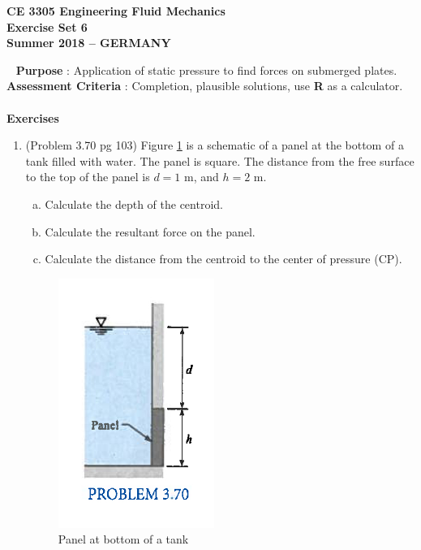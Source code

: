 \documentclass[12pt]{article}
\begin{document}
\begingroup
\begin{center}
{\textbf{{ CE 3305 Engineering Fluid Mechanics} \\ Exercise Set 6 \\ Summer 2018 -- GERMANY} }
\end{center}
\endgroup
\begingroup
~\newline
\textbf{Purpose} :  Application of static pressure to find forces on submerged plates. \\
\textbf{Assessment Criteria} : Completion, plausible solutions, use \textbf{R} as a calculator. \\~\\
\textbf{Exercises}

\begin{enumerate}
\item (Problem 3.70 pg 103)
Figure \ref{fig:SubmergedPanel} is a schematic of a panel at the bottom of a tank filled with water.  
The panel is square.  The distance from the free surface to the top of the panel is $d=1$ m, and $h=2$ m.   
\begin{enumerate}[a)]
\item Calculate the depth of the centroid.
\item Calculate the resultant force on the panel.
\item Calculate the distance from the centroid to the center of pressure (CP).
\end{enumerate}
\begin{figure}[htbp] %
   \centering
   \includegraphics[width=2in]{SubmergedPanel.jpg} 
   \caption{Panel at bottom of a tank}
   \label{fig:SubmergedPanel}
\end{figure}
\clearpage
~


\end{enumerate}
\end{document}
